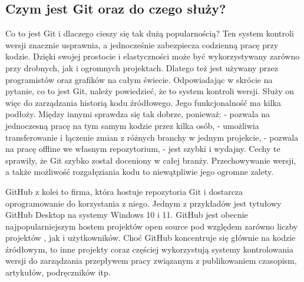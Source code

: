 \subsection{Czym jest Git oraz do czego służy?}
\hspace{0.60cm}Co to jest Git i dlaczego cieszy się tak dużą popularnością? Ten system kontroli wersji znacznie usprawnia, a jednocześnie zabezpiecza codzienną pracę przy kodzie. Dzięki swojej prostocie i elastyczności może być wykorzystywany zarówno przy drobnych, jak i ogromnych projektach. Dlatego też jest używany przez programistów oraz grafików na całym świecie. Odpowiadając w skrócie na pytanie, co to jest Git, należy powiedzieć, że to system kontroli wersji. Służy on więc do zarządzania historią kodu źródłowego. Jego funkcjonalność ma kilka podłoży. Między innymi sprawdza się tak dobrze, ponieważ: \newline
- pozwala na jednoczesną pracę na tym samym kodzie przez kilka osób, \newline
- umożliwia transferowanie i łączenie zmian z różnych branchy w jednym projekcie, \newline
- pozwala na pracę offline we własnym repozytorium, \newline
- jest szybki i wydajny.\newline 
Cechy te sprawiły, że Git szybko został doceniony w całej branży. Przechowywanie wersji, a także możliwość rozgałęziania kodu to niewątpliwie jego ogromne zalety. 
\newline

GitHub z kolei to firma, która hostuje repozytoria Git i dostarcza oprogramowanie do korzystania z niego. Jednym z przykładów jest tytułowy GitHub Desktop na systemy Windows 10 i 11. GitHub jest obecnie najpopularniejszym hostem projektów open source pod względem zarówno liczby projektów , jak i użytkowników. Choć GitHub koncentruje się głównie na kodzie źródłowym, to inne projekty coraz częściej wykorzystują systemy kontrolowania wersji do zarządzania przepływem pracy związanym z publikowaniem czasopism, artykułów, podręczników itp.\newline



